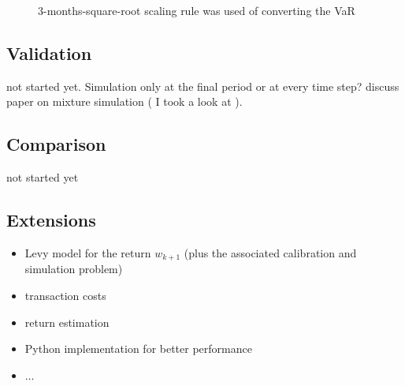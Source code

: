 \documentclass[]{article}
\begin{document}
\begin{figure}[H]
	
	\caption{3-months-square-root scaling rule was used of converting the VaR}
	\label{some example}
\end{figure}

\subsection{Validation}
not started yet. Simulation only at the final period or at every time step? discuss paper on mixture simulation ( I took a look at \cite{Wang01} ).
\subsection{Comparison}
not started yet
\subsection{Extensions}
\begin{itemize}
	\item Levy model for the return $ w_{k+1}$ (plus the associated calibration and simulation problem)
	\item transaction costs
	\item return estimation 
	\item Python implementation for better performance
	\item $ \dots$
\end{itemize}
\end{document}
